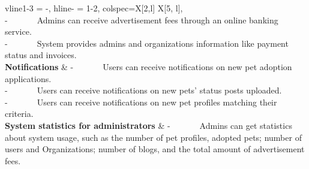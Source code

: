 \begin{longtblr}[
                caption = {Functional Requirements},
                label = {tblr:func_req},
        ]{
                vline{1-3} = {-}{},
                hline{-} = {1-2}{},
                colspec={X[2,l] X[5, l]},
        }
{        \\-~~~~~~~Admins can receive advertisement fees through an online banking service.
        \\-~~~~~~~System provides admins and organizations information like payment status and invoices.
        }                                                                     \\
        \textbf{Notifications}                        & {
                        -~~~~~~~Users can receive notifications on new pet adoption applications.
        \\-~~~~~~~Users can receive notifications on new pets’ status posts uploaded.
        \\-~~~~~~~Users can receive notifications on new pet profiles matching their criteria.
        }                                                                     \\
        \textbf{System statistics for administrators} & {
                        -~~~~~~~Admins can get statistics about system usage, such as the number of pet profiles, adopted pets; number of users and Organizations; number of blogs, and the total amount of advertisement fees.
        }                                                                     \\
\end{longtblr}
